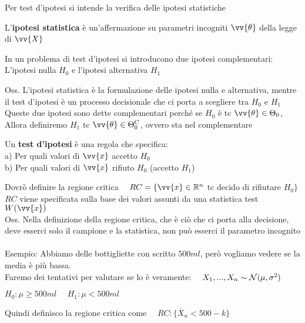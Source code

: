 
Per test d'ipotesi si intende la verifica delle ipotesi statistiche


\begin{defi}
L'\textbf{ipotesi statistica} è un'affermazione su parametri incogniti $\vv{\theta}$ della legge di $\vv{X}$
\end{defi}

\begin{defi}
    In un problema di test d'ipotesi si introducono due ipotesi complementari:
    L'ipotesi nulla $H_0$ e  l'ipotesi alternativa $H_1$
\end{defi}

Oss. L'ipotesi statistica è la formulazione delle ipotesi nulla e alternativa, mentre il test d'ipotesi è un processo decisionale che ci porta a scegliere tra $H_0$ e $H_1$\\

Queste due ipotesi sono dette complementari perché se $H_0$ è tc $\vv{\theta}\in \Theta_0$,\\
Allora definiremo $H_1$ tc $\vv{\theta}\in \Theta_0^C$, ovvero sta nel complementare\\

\begin{defi}
    Un \textbf{test d'ipotesi} è una regola che specifica:\\
    a) Per quali valori di $\vv{x}$ accetto $H_0$\\
    b) Per quali valori di $\vv{x}$ rifiuto $H_0$ (accetto $H_1$)
\end{defi}
\phantom{}

Dovrò definire la regione critica \ \ $RC= \{ \vv{x}\in\R^n$ tc decido di rifiutare $H_0 \}$\\
$RC$ viene specificata sulla base dei valori assunti da una statistica test $W(\vv{x})$ \\

Oss. Nella definizione della regione critica, che è ciò che ci porta alla decisione, deve esserci solo il campione e la statistica, non può esserci il parametro incognito\\ \\


Esempio: Abbiamo delle bottigliette con scritto $500ml$, però vogliamo vedere se la media è più bassa.\\
Faremo dei tentativi per valutare se lo è veramente: \ \ $X_1,...,X_n \sim \mathcal N (\mu,\sigma^2)$

$H_0: \mu \ge 500ml \ \ \ \ \ \ H_1 : \mu<500ml$

Quindi definisco la regione critica come \ \  $RC:\{\overline{X}_n < 500-k\}$\\

